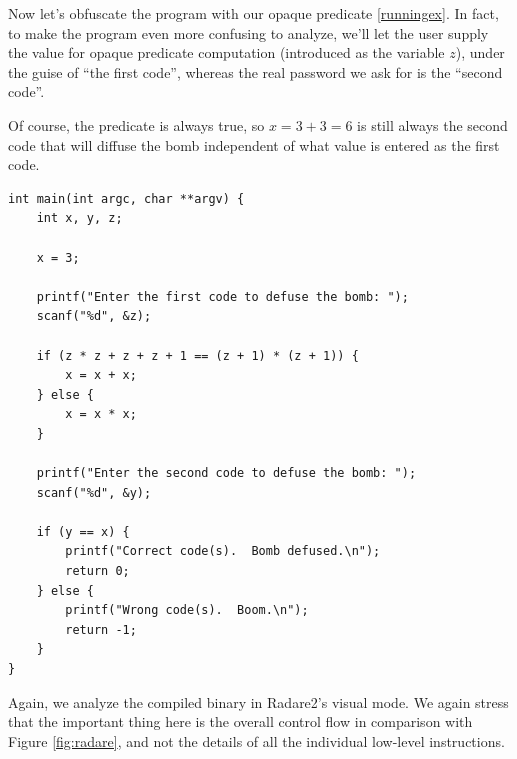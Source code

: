 \documentclass[12pt,notitlepage]{report}
\theoremstyle{plain}
\theoremstyle{definition}
\numberwithin{equation}{section}
\begin{document}
Now let's obfuscate the program with our opaque predicate \eqref{runningex}.  In fact, to make the program even more confusing to analyze, we'll let the user supply the value for opaque predicate computation (introduced as the variable $z$), under the guise of ``the first code'', whereas the real password we ask for is the ``second code''.  
\par Of course, the predicate is always true, so $x = 3 + 3 = 6$ is still always the second code that will diffuse the bomb independent of what value is entered as the first code.

\begin{verbatim}
int main(int argc, char **argv) {
    int x, y, z;

    x = 3;

    printf("Enter the first code to defuse the bomb: ");
    scanf("%d", &z);

    if (z * z + z + z + 1 == (z + 1) * (z + 1)) {
        x = x + x;
    } else {
        x = x * x;
    }

    printf("Enter the second code to defuse the bomb: ");
    scanf("%d", &y);

    if (y == x) {
        printf("Correct code(s).  Bomb defused.\n");
        return 0;
    } else {
        printf("Wrong code(s).  Boom.\n");
        return -1;
    }
}
\end{verbatim}

Again, we analyze the compiled binary in Radare2's visual mode.  We again stress that the important thing here is the overall control flow in comparison with Figure \ref{fig:radare}, and not the details of all the individual low-level instructions.
\end{document}
